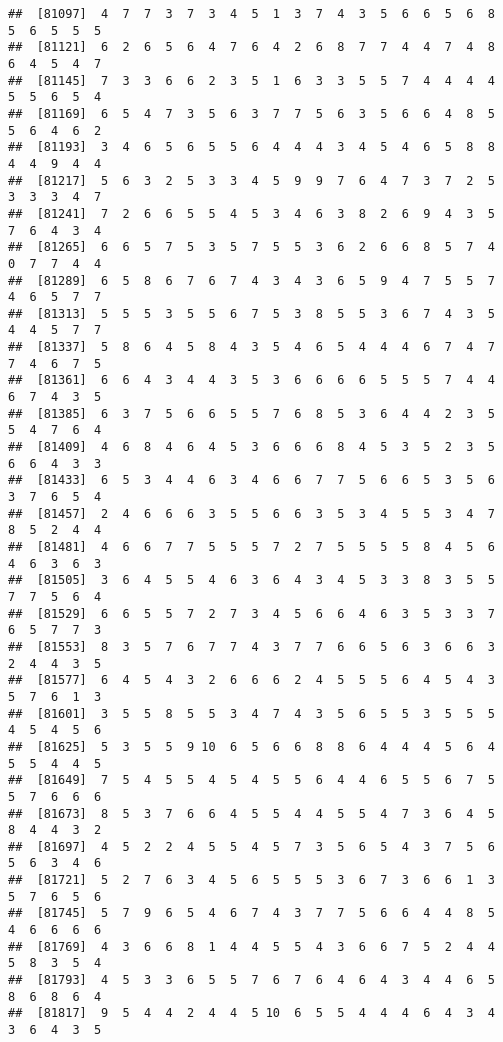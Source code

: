 \documentclass[
]{book}
\begin{document}
\begin{verbatim}
##  [81097]  4  7  7  3  7  3  4  5  1  3  7  4  3  5  6  6  5  6  8  5  6  5  5  5
##  [81121]  6  2  6  5  6  4  7  6  4  2  6  8  7  7  4  4  7  4  8  6  4  5  4  7
##  [81145]  7  3  3  6  6  2  3  5  1  6  3  3  5  5  7  4  4  4  4  5  5  6  5  4
##  [81169]  6  5  4  7  3  5  6  3  7  7  5  6  3  5  6  6  4  8  5  5  6  4  6  2
##  [81193]  3  4  6  5  6  5  5  6  4  4  4  3  4  5  4  6  5  8  8  4  4  9  4  4
##  [81217]  5  6  3  2  5  3  3  4  5  9  9  7  6  4  7  3  7  2  5  3  3  3  4  7
##  [81241]  7  2  6  6  5  5  4  5  3  4  6  3  8  2  6  9  4  3  5  7  6  4  3  4
##  [81265]  6  6  5  7  5  3  5  7  5  5  3  6  2  6  6  8  5  7  4  0  7  7  4  4
##  [81289]  6  5  8  6  7  6  7  4  3  4  3  6  5  9  4  7  5  5  7  4  6  5  7  7
##  [81313]  5  5  5  3  5  5  6  7  5  3  8  5  5  3  6  7  4  3  5  4  4  5  7  7
##  [81337]  5  8  6  4  5  8  4  3  5  4  6  5  4  4  4  6  7  4  7  7  4  6  7  5
##  [81361]  6  6  4  3  4  4  3  5  3  6  6  6  6  5  5  5  7  4  4  6  7  4  3  5
##  [81385]  6  3  7  5  6  6  5  5  7  6  8  5  3  6  4  4  2  3  5  5  4  7  6  4
##  [81409]  4  6  8  4  6  4  5  3  6  6  6  8  4  5  3  5  2  3  5  6  6  4  3  3
##  [81433]  6  5  3  4  4  6  3  4  6  6  7  7  5  6  6  5  3  5  6  3  7  6  5  4
##  [81457]  2  4  6  6  6  3  5  5  6  6  3  5  3  4  5  5  3  4  7  8  5  2  4  4
##  [81481]  4  6  6  7  7  5  5  5  7  2  7  5  5  5  5  8  4  5  6  4  6  3  6  3
##  [81505]  3  6  4  5  5  4  6  3  6  4  3  4  5  3  3  8  3  5  5  7  7  5  6  4
##  [81529]  6  6  5  5  7  2  7  3  4  5  6  6  4  6  3  5  3  3  7  6  5  7  7  3
##  [81553]  8  3  5  7  6  7  7  4  3  7  7  6  6  5  6  3  6  6  3  2  4  4  3  5
##  [81577]  6  4  5  4  3  2  6  6  6  2  4  5  5  5  6  4  5  4  3  5  7  6  1  3
##  [81601]  3  5  5  8  5  5  3  4  7  4  3  5  6  5  5  3  5  5  5  4  5  4  5  6
##  [81625]  5  3  5  5  9 10  6  5  6  6  8  8  6  4  4  4  5  6  4  5  5  4  4  5
##  [81649]  7  5  4  5  5  4  5  4  5  5  6  4  4  6  5  5  6  7  5  5  7  6  6  6
##  [81673]  8  5  3  7  6  6  4  5  5  4  4  5  5  4  7  3  6  4  5  8  4  4  3  2
##  [81697]  4  5  2  2  4  5  5  4  5  7  3  5  6  5  4  3  7  5  6  5  6  3  4  6
##  [81721]  5  2  7  6  3  4  5  6  5  5  5  3  6  7  3  6  6  1  3  5  7  6  5  6
##  [81745]  5  7  9  6  5  4  6  7  4  3  7  7  5  6  6  4  4  8  5  4  6  6  6  6
##  [81769]  4  3  6  6  8  1  4  4  5  5  4  3  6  6  7  5  2  4  4  5  8  3  5  4
##  [81793]  4  5  3  3  6  5  5  7  6  7  6  4  6  4  3  4  4  6  5  8  6  8  6  4
##  [81817]  9  5  4  4  2  4  4  5 10  6  5  5  4  4  4  6  4  3  4  3  6  4  3  5

\end{verbatim}
\end{document}

